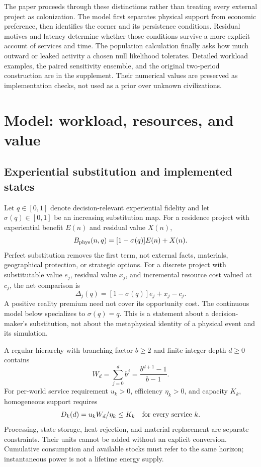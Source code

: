 The paper proceeds through these distinctions rather than treating every
external project as colonization. The model first separates physical
support from economic preference, then identifies the corner and its
persistence conditions. Residual motives and latency determine whether
those conditions survive a more explicit account of services and time.
The population calculation finally asks how much outward or leaked activity
a chosen null likelihood tolerates. Detailed workload examples, the paired
sensitivity ensemble, and the original two-period construction are in the
supplement. Their numerical values are preserved as implementation checks,
not used as a prior over unknown civilizations.

\section{Model: workload, resources, and value}
\label{sec:support}
\label{sec:allocation}
\subsection{Experiential substitution and implemented states}
Let $q\in[0,1]$ denote decision-relevant experiential fidelity and let
$\sigma(q)\in[0,1]$ be an increasing substitution map. For a residence
project with experiential benefit $E(n)$ and residual value $X(n)$,
\begin{equation}
 B_{\rm phys}(n,q)=[1-\sigma(q)]E(n)+X(n).
 \label{eq:experiential}
\end{equation}
Perfect substitution removes the first term, not external facts, materials,
geographical protection, or strategic options. For a discrete project with
substitutable value $e_j$, residual value $x_j$, and incremental resource
cost valued at $c_j$, the net comparison is
\begin{equation}
 \Delta_j(q)=[1-\sigma(q)]e_j+x_j-c_j.\label{eq:premium}
\end{equation}
A positive reality premium need not cover its opportunity cost. The
continuous model below specializes to $\sigma(q)=q$. This is a statement
about a decision-maker's substitution, not about the metaphysical identity
of a physical event and its simulation.

A regular hierarchy with branching factor $b\geq2$ and finite integer
depth $d\geq0$ contains
\begin{equation}
 W_d=\sum_{j=0}^{d}b^j=\frac{b^{d+1}-1}{b-1}.\label{eq:worlds}
\end{equation}
For per-world service requirement $u_k>0$, efficiency $\eta_k>0$, and
capacity $K_k$, homogeneous support requires
\begin{equation}
 D_k(d)=u_kW_d/\eta_k\leq K_k\quad\hbox{for every service }k.
 \label{eq:resource}
\end{equation}
Processing, state storage, heat rejection, and material replacement are
separate constraints. Their units cannot be added without an explicit
conversion. Cumulative consumption and available stocks must refer to the
same horizon; instantaneous power is not a lifetime energy supply.

